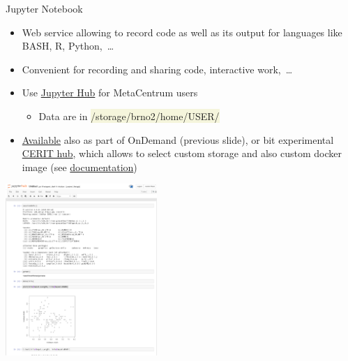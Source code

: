 \documentclass[compress, ucs, xelatex, 11pt, xcolor=svgnames, aspectratio=169,
	hyperref={
		bookmarks=true,
		unicode=true,
		colorlinks=true,
		pdftitle={Linux, command line and MetaCentrum},
		plainpages=false,
		pdfauthor={Vojtech Zeisek},
		pdfsubject={Course about use of Linux command line, writing shell scripts and using MetaCentrum of CESNET},
		pdfcreator={XeLaTeX},
		pdfkeywords={Linux, GNU, BASH, shell, command line, MetaCentrum},
		linkcolor=DarkRed, %
		anchorcolor=DarkBlue, %
		citecolor=Indigo, %
		filecolor=NavyBlue, %
		menucolor=DarkMagenta, %
		urlcolor=DarkBlue, %
		pdftex},
	url={hyphens, lowtilde} %
	]{beamer}
\renewcommand{\texttt}[1]{\colorbox{Beige}{{\ttfamily #1}}}
\begin{document}
\begin{frame}{Jupyter Notebook}
	\begin{multicols}{2}
		\begin{itemize}
			\item Web service allowing to record code as well as its output for languages like BASH, R, Python,~\ldots
			\item Convenient for recording and sharing code, interactive work,~\ldots
			\item Use \href{https://wiki.metacentrum.cz/wiki/Jupyter_for_MetaCentrum_users}{Jupyter Hub} for MetaCentrum users
			\begin{itemize}
				\item Data are in \texttt{/storage/brno2/home/USER/}
			\end{itemize}
			\item \href{https://wiki.metacentrum.cz/wiki/Jupyter_notebook}{Available} also as part of OnDemand (previous slide), or bit experimental \href{https://hub.cerit-sc.cz/}{CERIT hub}, which allows to select custom storage and also custom docker image (see \href{https://docs.cerit.io/docs/jupyterhub.html}{documentation})
		\end{itemize}
		\begin{center}
			\includegraphics[height=6.5cm]{jupyter.png}
		\end{center}
	\end{multicols}
\end{frame}
\end{document}
